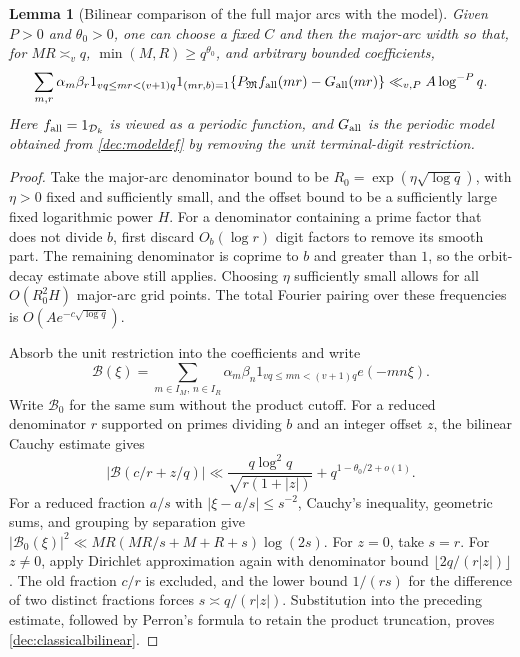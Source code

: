 \documentclass[11pt,a4paper]{article}
\theoremstyle{paperplain}
\newtheorem{lemma}[theorem]{Lemma}
\numberwithin{equation}{section}
\begin{document}
\begin{lemma}[Bilinear comparison of the full major arcs with the model]\label{dec:bridge}
Given $P>0$ and $\theta_0>0$, one can choose a fixed $C$ and then
the major-arc width so that, for $MR\asymp_vq$,
$\min(M,R)\ge q^{\theta_0}$, and arbitrary bounded coefficients,
\begin{equation}\label{dec:bridgeeq}
 \sum_{m,r}\alpha_m\beta_r1_{vq\le mr<(v+1)q}1_{(mr,b)=1}
 \{P_{\mathfrak M}f_{\rm all}(mr)-G_{\rm all}(mr)\}
 \ll_{v,P}A\log^{-P}q.
\end{equation}
Here $f_{\rm all}=1_{\mathcal D_k}$ is viewed as a periodic function,
and $G_{\rm all}$ is the periodic model obtained from
\eqref{dec:modeldef} by removing the unit terminal-digit restriction.
\end{lemma}
\begin{proof}
Take the major-arc denominator bound to be
$R_0=\exp(\eta\sqrt{\log q})$, with $\eta>0$ fixed and sufficiently
small, and the offset bound to be a sufficiently large fixed
logarithmic power $H$.
For a denominator containing a prime factor that does not divide $b$,
first discard $O_b(\log r)$ digit factors to remove its smooth part.
The remaining denominator is coprime to $b$ and greater than $1$,
so the orbit-decay estimate above still applies.
Choosing $\eta$ sufficiently small allows for all $O(R_0^2H)$
major-arc grid points. The total Fourier pairing over these
frequencies is $O(Ae^{-c\sqrt{\log q}})$.

Absorb the unit restriction into the coefficients and write
\[
 \mathcal B(\xi)=\sum_{m\in I_M,\,n\in I_R}\alpha_m\beta_n
                 1_{vq\le mn<(v+1)q}e(-mn\xi).
\]
Write $\mathcal B_0$ for the same sum without the product cutoff.
For a reduced denominator $r$ supported on primes dividing $b$ and
an integer offset $z$, the bilinear Cauchy estimate gives
\begin{equation}\label{dec:classicalbilinear}
 |\mathcal B(c/r+z/q)|
 \ll\frac{q\log^2q}{\sqrt{r(1+|z|)}}+q^{1-\theta_0/2+o(1)}.
\end{equation}
For a reduced fraction $a/s$ with $|\xi-a/s|\le s^{-2}$, Cauchy's inequality,
geometric sums, and grouping by separation give
$|\mathcal B_0(\xi)|^2\ll MR(MR/s+M+R+s)\log(2s)$.
For $z=0$, take $s=r$.
For $z\ne0$, apply Dirichlet approximation again with denominator
bound $\lfloor2q/(r|z|)\rfloor$.
The old fraction $c/r$ is excluded, and the lower bound $1/(rs)$
for the difference of two distinct fractions forces
$s\asymp q/(r|z|)$.
Substitution into the preceding estimate, followed by Perron's
formula to retain the product truncation, proves
\eqref{dec:classicalbilinear}.


\end{proof}
\end{document}

